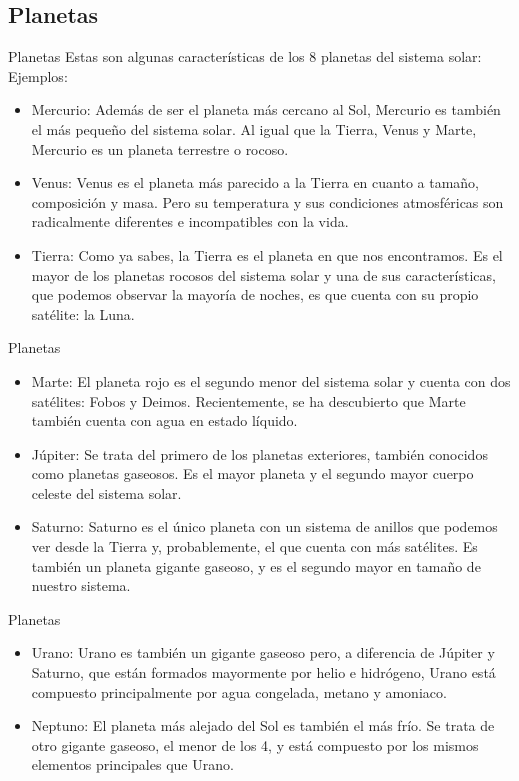 \documentclass[11pt,xcolor=pdftex,dvinames,table]{beamer}
\begin{document}
	\subsection{Planetas}	
	    \begin{frame}{Planetas}
			\justifying
			Estas son algunas características de los 8 planetas del sistema solar:
			Ejemplos:
			\begin{itemize}
			    \item Mercurio: Además de ser el planeta más cercano al Sol, Mercurio es también el más pequeño del sistema solar. Al igual que la Tierra, Venus y Marte, Mercurio es un planeta terrestre o rocoso.
			    \item Venus: Venus es el planeta más parecido a la Tierra en cuanto a tamaño, composición y masa. Pero su temperatura y sus condiciones atmosféricas son radicalmente diferentes e incompatibles con la vida.
			    \item Tierra: Como ya sabes, la Tierra es el planeta en que nos encontramos. Es el mayor de los planetas rocosos del sistema solar y una de sus características, que podemos observar la mayoría de noches, es que cuenta con su propio satélite: la Luna. 
			\end{itemize}
		\end{frame}
	    \begin{frame}{Planetas}
			\justifying
			\begin{itemize}
			    \item Marte: El planeta rojo es el segundo menor del sistema solar y cuenta con dos satélites: Fobos y Deimos. Recientemente, se ha descubierto que Marte también cuenta con agua en estado líquido.
			    \item Júpiter: Se trata del primero de los planetas exteriores, también conocidos como planetas gaseosos. Es el mayor planeta y el segundo mayor cuerpo celeste del sistema solar.
			    \item Saturno: Saturno es el único planeta con un sistema de anillos que podemos ver desde la Tierra y, probablemente, el que cuenta con más satélites. Es también un planeta gigante gaseoso, y es el segundo mayor en tamaño de nuestro sistema.
			\end{itemize}
		\end{frame}
		\begin{frame}{Planetas}
			\justifying
			\begin{itemize}
			    \item Urano: Urano es también un gigante gaseoso pero, a diferencia de Júpiter y Saturno, que están formados mayormente por helio e hidrógeno, Urano está compuesto principalmente por agua congelada, metano y amoniaco.
			    \item Neptuno: El planeta más alejado del Sol es también el más frío. Se trata de otro gigante gaseoso, el menor de los 4, y está compuesto por los mismos elementos principales que Urano.
 
			\end{itemize}
		\end{frame}
\end{document}
